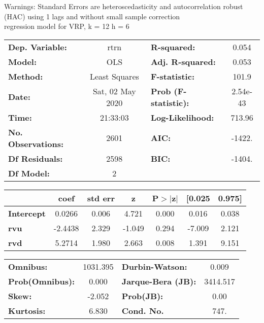 Warnings: \newline
 [1] Standard Errors are heteroscedasticity and autocorrelation robust (HAC) using 1 lags and without small sample correction\\ 

regression model for VRP, k = 12 h = 6\begin{center}
\begin{tabular}{lclc}
\toprule
\textbf{Dep. Variable:}    &       rtrn       & \textbf{  R-squared:         } &     0.054   \\
\textbf{Model:}            &       OLS        & \textbf{  Adj. R-squared:    } &     0.053   \\
\textbf{Method:}           &  Least Squares   & \textbf{  F-statistic:       } &     101.9   \\
\textbf{Date:}             & Sat, 02 May 2020 & \textbf{  Prob (F-statistic):} &  2.54e-43   \\
\textbf{Time:}             &     21:33:03     & \textbf{  Log-Likelihood:    } &    713.96   \\
\textbf{No. Observations:} &        2601      & \textbf{  AIC:               } &    -1422.   \\
\textbf{Df Residuals:}     &        2598      & \textbf{  BIC:               } &    -1404.   \\
\textbf{Df Model:}         &           2      & \textbf{                     } &             \\
\bottomrule
\end{tabular}
\begin{tabular}{lcccccc}
                   & \textbf{coef} & \textbf{std err} & \textbf{z} & \textbf{P$> |$z$|$} & \textbf{[0.025} & \textbf{0.975]}  \\
\midrule
\textbf{Intercept} &       0.0266  &        0.006     &     4.721  &         0.000        &        0.016    &        0.038     \\
\textbf{rvu}       &      -2.4438  &        2.329     &    -1.049  &         0.294        &       -7.009    &        2.121     \\
\textbf{rvd}       &       5.2714  &        1.980     &     2.663  &         0.008        &        1.391    &        9.151     \\
\bottomrule
\end{tabular}
\begin{tabular}{lclc}
\textbf{Omnibus:}       & 1031.395 & \textbf{  Durbin-Watson:     } &    0.009  \\
\textbf{Prob(Omnibus):} &   0.000  & \textbf{  Jarque-Bera (JB):  } & 3414.517  \\
\textbf{Skew:}          &  -2.052  & \textbf{  Prob(JB):          } &     0.00  \\
\textbf{Kurtosis:}      &   6.830  & \textbf{  Cond. No.          } &     747.  \\
\bottomrule
\end{tabular}
\end{center}

